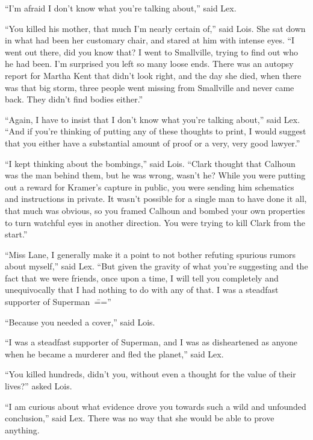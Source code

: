 \documentclass[ebook,12pt]{memoir}
\begin{document}
``I'm afraid I don't know what you're talking about,'' said Lex.

``You killed his mother, that much I'm nearly certain of,'' said Lois.
She sat down in what had been her customary chair, and stared at him
with intense eyes. ``I went out there, did you know that? I went to
Smallville, trying to find out who he had been. I'm surprised you left
so many loose ends. There was an autopsy report for Martha Kent that
didn't look right, and the day she died, when there was that big storm,
three people went missing from Smallville and never came back. They
didn't find bodies either.''

``Again, I have to insist that I don't know what you're talking about,''
said Lex. ``And if you're thinking of putting any of these thoughts to
print, I would suggest that you either have a substantial amount of
proof or a very, very good lawyer.''

``I kept thinking about the bombings,'' said Lois. ``Clark thought that
Calhoun was the man behind them, but he was wrong, wasn't he? While you
were putting out a reward for Kramer's capture in public, you were
sending him schematics and instructions in private. It wasn't possible
for a single man to have done it all, that much was obvious, so you
framed Calhoun and bombed your own properties to turn watchful eyes in
another direction. You were trying to kill Clark from the start.''

``Miss Lane, I generally make it a point to not bother refuting spurious
rumors about myself,'' said Lex. ``But given the gravity of what you're
suggesting and the fact that we were friends, once upon a time, I will
tell you completely and unequivocally that I had nothing to do with any
of that. I was a steadfast supporter of Superman~\===''

``Because you needed a cover,'' said Lois.

``I was a steadfast supporter of Superman, and I was as disheartened as
anyone when he became a murderer and fled the planet,'' said Lex.

``You killed hundreds, didn't you, without even a thought for the value
of their lives?'' asked Lois.

``I am curious about what evidence drove you towards such a wild and
unfounded conclusion,'' said Lex. There was no way that she would be
able to prove anything.
\end{document}
